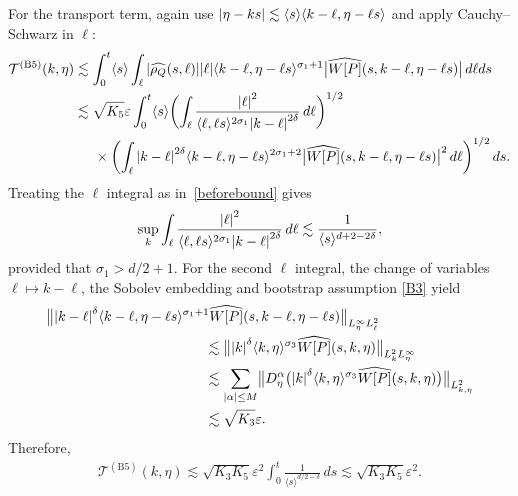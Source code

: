 \documentclass[JEP,XML,SOM,Unicode]{cedram}
\newcommand{\bnorm}[1]{\bigl\|#1\bigr\|}
\newcommand{\babs}[1]{\bigl|#1\bigr|}
\theoremstyle{plain}
\theoremstyle{remark}
\newcommand{\br}[1]{\left(#1\right)}
\newcommand{\bbr}[1]{\bigl(#1 \bigr)}
\newcommand{\bbbr}[1]{\biggl(#1 \biggr)}
\newcommand{\aal}{\abs{\alpha}}
\newcommand{\jb}[1]{\langle#1\rangle}
\newcommand{\ep}{\varepsilon}
\begin{document}
For the transport term, again use $\abs{\eta-ks} \lesssim \jb{s} \jb{k-\ell,\eta-\ell s}$ and apply Cauchy--Schwarz in $\ell$:
\begin{align*}
\mathcal{T}^{\mathrm{(B5)}}(k,\eta)&\lesssim\int_0^t\jb{s}\int_\ell \abs{\widehat{\rho_Q}(s,\ell )}\abs{\ell}\jb{k-\ell,\eta-\ell s}^{\sigma_1+1}\babs{\widehat{W[P]}(s,k-\ell ,\eta-\ell s)}\,d\ell ds\\
&\lesssim\sqrt{K_5}\ep\int_0^t\jb{s}\bbbr{\int_\ell\frac{\abs{\ell}^2}{\jb{\ell,\ell s}^{2\sigma_1}\abs{k-\ell}^{2\delta}}\,d\ell}^{1/2}\\
&\hspace{0.5cm}\times\br{\int_\ell \abs{k-\ell}^{2\delta}\jb{k-\ell,\eta-\ell s}^{2\sigma_1+2}\babs{\widehat{W[P]}(s,k-\ell ,\eta-\ell s)}^2\,d\ell}^{1/2} ds.
\end{align*}
Treating the $\ell$ integral as in~\eqref{beforebound} gives
\begin{align*}
\sup_{k}\int_\ell\frac{\abs{\ell}^2}{\jb{\ell,\ell s}^{2\sigma_1}\abs{k-\ell}^{2\delta}}\,d\ell\lesssim\frac{1}{\jb{s}^{d+2-2\delta}},
\end{align*}
provided that $\sigma_1>d/2+1$. For the second $\ell$ integral, the change of variables $\ell\mapsto k-\ell$, the Sobolev embedding and bootstrap assumption \eqref{B3} yield
\begin{align*}
&\bnorm{\abs{k-\ell}^{\delta}\jb{k-\ell,\eta-\ell s}^{\sigma_1+1}\widehat{W[P]}(s,k-\ell,\eta-\ell s)}_{L^\infty_\eta L^2_\ell}\\
&\hspace{4cm}\lesssim\bnorm{\abs{k}^{\delta}\jb{k,\eta}^{\sigma_3}\widehat{W[P]}(s,k,\eta)}_{L^2_k L^\infty_\eta}\\
&\hspace{4cm}\lesssim\sum_{\aal\leq M}\bnorm{D^\alpha_\eta\bbr{\abs{k}^{\delta}\jb{k,\eta}^{\sigma_3}\widehat{W[P]}(s,k,\eta)}}_{L^2_{k,\eta}}\\
&\hspace{4cm}\lesssim\sqrt{K_3}\ep.
\end{align*}
Therefore,
\begin{align*}
\mathcal{T}^{\mathrm{(B5)}}(k,\eta)\lesssim\sqrt{K_3K_5}\ep^2\int_0^t\frac{1}{\jb{s}^{{d/2}-\delta}}\,ds\lesssim\sqrt{K_3K_5}\ep^2.
\end{align*}
\end{document}
